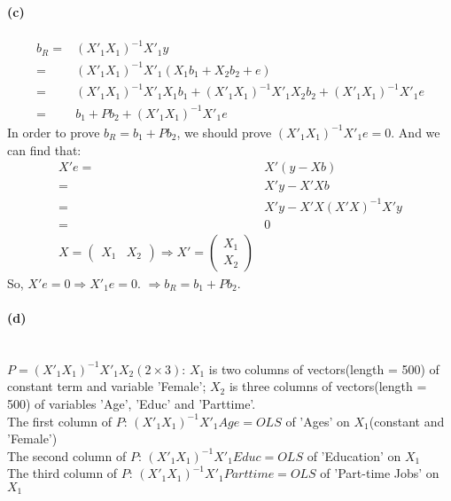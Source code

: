 \documentclass{article}
\begin{document}
\paragraph{(c)}
\[\begin{aligned}
b_{R} = &\left(X'_{1}X_{1}\right)^{-1}X'_{1}y\\
      = &\left(X'_{1}X_{1}\right)^{-1}X'_{1}\left(X_{1}b_{1} + X_{2}b_{2} + e\right)\\
      = &\left(X'_{1}X_{1}\right)^{-1}X'_{1}X_{1}b_{1} + \left(X'_{1}X_{1}\right)^{-1}X'_{1}X_{2}b_{2} + \left(X'_{1}X_{1}\right)^{-1}X'_{1}e\\
      = &b_{1} + Pb_{2} + \left(X'_{1}X_{1}\right)^{-1}X'_{1}e
\end{aligned}
\]
In order to prove $b_{R} = b_{1} + Pb_{2}$, we should prove $\left(X'_{1}X_{1}\right)^{-1}X'_{1}e = 0$. And we can find that:
\[\begin{aligned}
X'e = &X'(y - Xb)\\
    = &X'y - X'Xb\\
    = &X'y - X'X(X'X)^{-1}X'y\\
    = &0\\
X = \begin{pmatrix} X_{1} & X_{2} \end{pmatrix} \Rightarrow X' = \begin{pmatrix} X_{1} \\ X_{2} \end{pmatrix}
\end{aligned}
\]
So, $X'e = 0 \Rightarrow X'_{1}e = 0$. $\Rightarrow b_{R} = b_{1} + Pb_{2}$.

\paragraph{(d)}~\\
$P = \left(X'_{1}X_{1}\right)^{-1}X'_{1}X_{2} (2\times3)$: $X_{1}$ is two columns of vectors(length = 500) of constant term and variable 'Female'; $X_{2}$ is three columns of vectors(length = 500) of variables 'Age', 'Educ' and 'Parttime'.\\
The first column of $P$: $\left(X'_{1}X_{1}\right)^{-1}X'_{1}Age = OLS$ of 'Ages' on $X_{1}$(constant and 'Female')\\
The second column of $P$: $\left(X'_{1}X_{1}\right)^{-1}X'_{1}Educ = OLS$ of 'Education' on $X_{1}$\\
The third column of $P$: $\left(X'_{1}X_{1}\right)^{-1}X'_{1}Parttime = OLS$ of 'Part-time Jobs' on $X_{1}$
\end{document}
